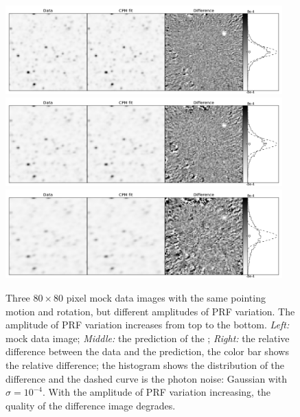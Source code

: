 \begin{figure}[p]
\begin{center}
\includegraphics[width=0.95\textwidth]{figures/cdi/f9a}
\includegraphics[width=0.95\textwidth]{figures/cdi/f9b}
\includegraphics[width=0.95\textwidth]{figures/cdi/f9c}
\end{center}
\caption{
  \label{large_prf}
  Three $80\times 80$ pixel mock data images with the same pointing motion and rotation, but different amplitudes of PRF variation. The amplitude of PRF variation increases from top to the bottom.
  \emph{Left:} mock data image;
  \emph{Middle:} the prediction of the \cpmdiff;
  \emph{Right:} the relative difference between the data and the prediction, the color bar shows the relative difference; the histogram shows the distribution of the difference and the dashed curve is the photon noise: Gaussian with $\sigma = 10^{-4}$. 
  With the amplitude of PRF variation increasing, the quality of the difference image degrades.
}
\end{figure}

